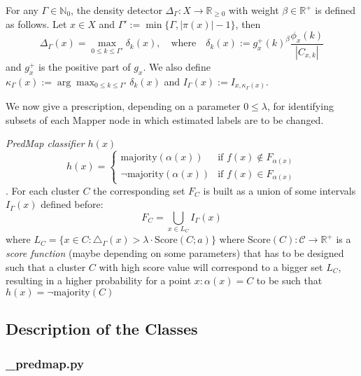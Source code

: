 \begin{definition}\label{def:}
	For any $\Gamma \in \mathbb{N}_0$, the density detector $\Delta_\Gamma : X \rightarrow \mathbb R_{\geq 0}$ with weight $\beta \in \mathbb R^+$ is defined as follows.  Let $x \in X$ and $\Gamma' := \min\{ \Gamma, |\pi(x)| - 1\}$, then
	\begin{equation*}
	\Delta_\Gamma (x)= \max\limits_{0 \leq k \leq \Gamma'} \delta_k(x), \quad \text{where} \quad \delta_k(x) := g_x^+(k)^{\beta} \frac{\phi_x(k)}{|C_{x,k}|}
	\end{equation*}
	and $g_x^+$ is the positive part of $g_x$.  We also define $\kappa_\Gamma(x) := \arg \max_{0 \leq k \leq \Gamma'}\delta_k(x)$ and $I_\Gamma(x) := I_{x, \kappa_\Gamma(x)}$.
\end{definition}

We now give a prescription, depending on a parameter $0 \leq \lambda$, for identifying subsets of each Mapper node in which estimated labels are to be changed. 

\begin{definition}{\textit{PredMap classifier $h(x)$}}\\
$$h(x) = \begin{cases}
\text{majority}(\alpha(x))& \text{if } f(x)\notin F_{\alpha(x)}\\
\lnot\text{majority}(\alpha(x))& \text{if } f(x)\in F_{\alpha(x)}
\end{cases}$$. For each cluster $C$ the corresponding set $F_C$ is built as a union of some intervals $I_\Gamma(x)$ defined before: $$F_C=\bigcup_{x\in L_C} I_\Gamma(x)$$ where $L_C = \{x\in C: \triangle_\Gamma(x)>\lambda\cdot \text{Score}(C;a)\}$ where Score$(C): \mathcal C\rightarrow \mathbb R^+$ is a \textit{score function} (maybe depending on some parameters)  that has to be designed such that a cluster $C$ with high score value will correspond to a bigger set $L_C$, resulting in a higher probability for a point $x: \alpha(x)=C$ to be such that $h(x)=\lnot \text{majority}(C)$
\end{definition}

\subsection{Description of the Classes}\label{sec:predmap description of the classes}

\subsubsection{\_predmap.py}
